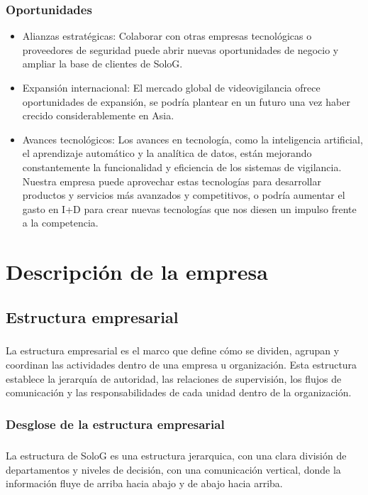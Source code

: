 \documentclass{report}
\begin{document}
        \subsection*{Oportunidades}
            \begin{itemize}
                \item Alianzas estratégicas: Colaborar con otras empresas tecnológicas o proveedores de seguridad puede abrir nuevas oportunidades de negocio y ampliar la base de clientes de SoloG.
                \item Expansión internacional: El mercado global de videovigilancia ofrece oportunidades de expansión, se podría plantear en un futuro una vez haber crecido considerablemente en Asia.
                \item Avances tecnológicos: Los avances en tecnología, como la inteligencia artificial, el aprendizaje automático y la analítica de datos, están mejorando constantemente la funcionalidad y eficiencia de los sistemas de vigilancia. Nuestra empresa puede aprovechar estas tecnologías para desarrollar productos y servicios más avanzados y competitivos, o podría aumentar el gasto en I+D para crear nuevas tecnologías que nos diesen un impulso frente a la competencia.
            \end{itemize}
      
    \chapter{Descripción de la empresa}
        \section{Estructura empresarial}
          \paragraph*{}{
                La estructura empresarial es el marco que define cómo se dividen, agrupan y coordinan las actividades dentro de una empresa u organización. 
                Esta estructura establece la jerarquía de autoridad, las relaciones de supervisión, los flujos de comunicación y las responsabilidades de cada unidad dentro de la organización.
              }
          \subsection{Desglose de la estructura empresarial}
            \paragraph*{}
            {
              La estructura de SoloG es una estructura jerarquica, con una clara división de departamentos y niveles de decisión, con una comunicación vertical, donde la información fluye de arriba hacia abajo y de abajo hacia arriba.
            }
\end{document}
